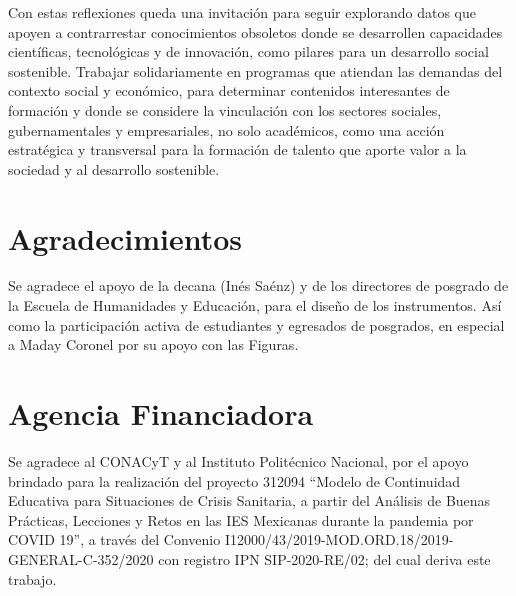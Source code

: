 \documentclass[spanish]{textolivre}
\begin{document}
Con estas reflexiones queda una invitación para seguir explorando datos que apoyen a contrarrestar conocimientos obsoletos donde se desarrollen capacidades científicas, tecnológicas y de innovación, como pilares para un desarrollo social sostenible. Trabajar solidariamente en programas que atiendan las demandas del contexto social y económico, para determinar contenidos interesantes de formación y donde se considere la vinculación con los sectores sociales, gubernamentales y empresariales, no solo académicos, como una acción estratégica y transversal para la formación de talento que aporte valor a la sociedad y al desarrollo sostenible.

\section{Agradecimientos}\label{sec-links}
Se agradece el apoyo de la decana (Inés Saénz) y de los directores de posgrado de la Escuela de Humanidades y Educación, para el diseño de los instrumentos. Así como la participación activa de estudiantes y egresados de posgrados, en especial a Maday Coronel por su apoyo con las Figuras.

\section{Agencia Financiadora}\label{sec-outras-estr}
Se agradece al CONACyT y al Instituto Politécnico Nacional, por el apoyo brindado para la realización del proyecto 312094 “Modelo de Continuidad Educativa para Situaciones de Crisis Sanitaria, a partir del Análisis de Buenas Prácticas, Lecciones y Retos en las IES Mexicanas durante la pandemia por COVID 19”,  a través del Convenio I12000/43/2019-MOD.ORD.18/2019-GENERAL-C-352/2020 con registro IPN SIP-2020-RE/02; del cual deriva este trabajo.

\printbibliography\label{sec-bib}
\end{document}
